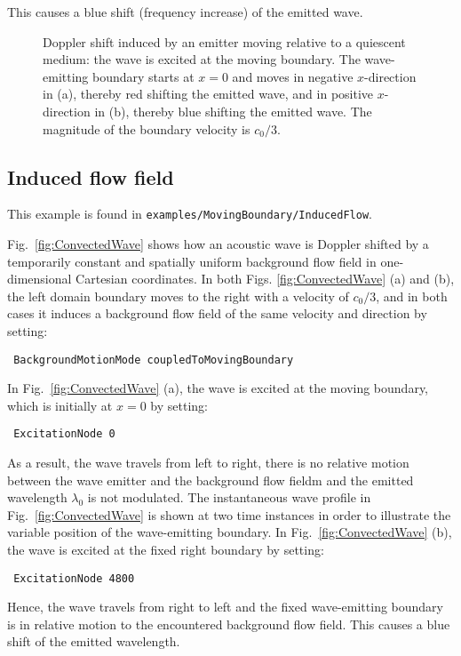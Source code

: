 This causes a blue shift (frequency increase) of the emitted wave.

\begin{figure}
    \centering
    \caption{Doppler shift induced by an emitter moving relative to a quiescent medium: the wave is excited at the moving boundary. The wave-emitting boundary starts at $x=0$ and moves in negative $x$-direction in (a), thereby red shifting the emitted wave, and in positive $x$-direction in (b), thereby blue shifting the emitted wave. The magnitude of the boundary velocity is $c_0/3$.}
    \label{fig:RelativeEmitterMotion}
\end{figure}


\subsection{Induced flow field}

This example is found in {\tt examples/MovingBoundary/InducedFlow}.

Fig.~\ref{fig:ConvectedWave} shows how an acoustic wave is Doppler shifted by a temporarily constant and spatially uniform background flow field in one-dimensional Cartesian coordinates. In both Figs. \ref{fig:ConvectedWave} (a) and (b), the left domain boundary moves to the right with a velocity of $c_0/3$, and in both cases it induces a background flow field of the same velocity and direction by setting:

{\tt
BackgroundMotionMode coupledToMovingBoundary
}

In Fig.~\ref{fig:ConvectedWave} (a), the wave is excited at the moving boundary, which is initially at $x=0$ by setting:

{\tt
ExcitationNode 0
}

As a result, the wave travels from left to right, there is no relative motion between the wave emitter and the background flow fieldm and the emitted wavelength $\lambda_0$ is not modulated. The instantaneous wave profile in Fig.~\ref{fig:ConvectedWave} is shown at two time instances in order to illustrate the variable position of the wave-emitting boundary. In Fig.~\ref{fig:ConvectedWave} (b), the wave is excited at the fixed right boundary by setting:

{\tt
ExcitationNode 4800
}

Hence, the wave travels from right to left and the fixed wave-emitting boundary is in relative motion to the encountered background flow field. This causes a blue shift of the emitted wavelength.

